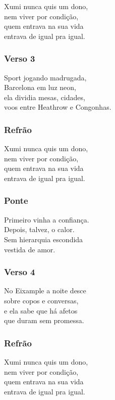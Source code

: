 Xumi nunca quis um dono,\\
nem viver por condição,\\
quem entrava na sua vida\\
entrava de igual pra igual.

\subsubsection{Verso 3}\label{verso-3-1}

Sport jogando madrugada,\\
Barcelona em luz neon,\\
ela dividia mesas, cidades,\\
voos entre Heathrow e Congonhas.

\subsubsection{Refrão}\label{refruxe3o-1}

Xumi nunca quis um dono,\\
nem viver por condição,\\
quem entrava na sua vida\\
entrava de igual pra igual.

\subsubsection{Ponte}\label{ponte}

Primeiro vinha a confiança.\\
Depois, talvez, o calor.\\
Sem hierarquia escondida\\
vestida de amor.

\subsubsection{Verso 4}\label{verso-4-1}

No Eixample a noite desce\\
sobre copos e conversas,\\
e ela sabe que há afetos\\
que duram sem promessa.

\subsubsection{Refrão}\label{refruxe3o-2}

Xumi nunca quis um dono,\\
nem viver por condição,\\
quem entrava na sua vida\\
entrava de igual pra igual.

